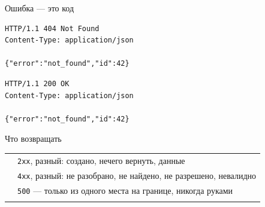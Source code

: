 \documentclass[aspectratio=169,10pt,t]{beamer}
\newcommand{\codesm}{\ttfamily\fontsize{7.6}{9.0}\selectfont}
\begin{document}
\begin{frame}[fragile]{Ошибка --- это код}
  \slidetop

  \begin{minipage}[t]{0.47\textwidth}
    \par\vspace{0.5em}
\begin{lstlisting}[style=plain,basicstyle=\codesm]
HTTP/1.1 404 Not Found
Content-Type: application/json

{"error":"not_found","id":42}
\end{lstlisting}
  \end{minipage}\hfill
  \begin{minipage}[t]{0.47\textwidth}
    \par\vspace{0.5em}
\begin{lstlisting}[style=plain,basicstyle=\codesm]
HTTP/1.1 200 OK
Content-Type: application/json

{"error":"not_found","id":42}
\end{lstlisting}
  \end{minipage}

  \slidegap
\end{frame}

\begin{frame}{Что возвращать}
  \slidetop
  {\renewcommand{\arraystretch}{1.75}
  \begin{tabular}{@{}L{3.6cm}L{9.2cm}@{}}
              & \texttt{2xx}, разный: создано, нечего
      вернуть, данные \\
     & \texttt{4xx}, разный: не разобрано, не
      найдено, не разрешено, невалидно \\
     & \texttt{500} --- только из одного места на
      границе, никогда руками \\
             &  \\
  \end{tabular}}

  \slidegap
\end{frame}
\end{document}
